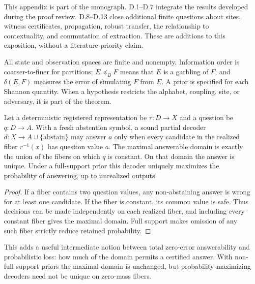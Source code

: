 
This appendix is part of the monograph. D.1--D.7 integrate the results developed during the proof review. D.8--D.13 close additional finite questions about sites, witness certificates, propagation, robust transfer, the relationship to contextuality, and commutation of extraction. These are additions to this exposition, without a literature-priority claim.

All state and observation spaces are finite and nonempty. Information order is coarser-to-finer for partitions; $E\preceq_B F$ means that $E$ is a garbling of $F$, and $\delta(E,F)$ measures the error of simulating $F$ from $E$. A prior is specified for each Shannon quantity. When a hypothesis restricts the alphabet, coupling, site, or adversary, it is part of the theorem.


\begin{thmplain}
Let a deterministic registered representation be $r:D\to X$ and a question be $q:D\to A$. With a fresh abstention symbol, a sound partial decoder $d:X\to A\cup\{\mathrm{abstain}\}$ may answer $a$ only when every candidate in the realized fiber $r^{-1}(x)$ has question value $a$. The maximal answerable domain is exactly the union of the fibers on which $q$ is constant. On that domain the answer is unique. Under a full-support prior this decoder uniquely maximizes the probability of answering, up to unrealized outputs.
\end{thmplain}
\begin{proof}
If a fiber contains two question values, any non-abstaining answer is wrong for at least one candidate. If the fiber is constant, its common value is safe. Thus decisions can be made independently on each realized fiber, and including every constant fiber gives the maximal domain. Full support makes omission of any such fiber strictly reduce retained probability.
\end{proof}

This adds a useful intermediate notion between total zero-error answerability and probabilistic loss: how much of the domain permits a certified answer. With non-full-support priors the maximal domain is unchanged, but probability-maximizing decoders need not be unique on zero-mass fibers.

